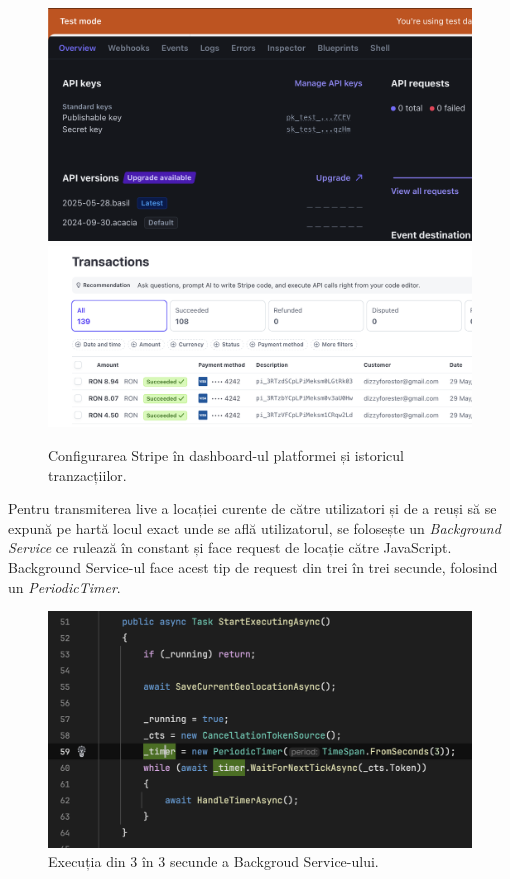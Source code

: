 \begin{figure}[H]
    \centering
    \includegraphics[width=14cm]{Assets/stripeSite.png}
    \includegraphics[width=14cm]{Assets/stripeHistory.png}
    \caption{Configurarea Stripe în dashboard-ul platformei și istoricul tranzacțiilor.}
    \label{fig:stripeSiteHistory}
\end{figure}

Pentru transmiterea live a locației curente de către utilizatori și de a reuși să se expună pe hartă
locul exact unde se află utilizatorul, se folosește un \textit{Background Service} ce rulează în constant și face request de locație către JavaScript.
Background Service-ul face acest tip de request din trei în trei secunde, folosind un \textit{PeriodicTimer}.

\begin{figure}[H]
    \centering
    \includegraphics[width=14cm]{Assets/timer.png}
    \caption{Execuția din 3 în 3 secunde a Backgroud Service-ului.}
    \label{fig:timer}
\end{figure}

